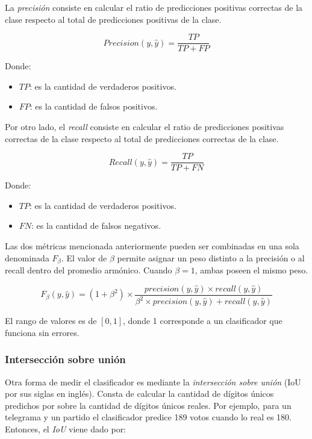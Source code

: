 La {\it precisión} consiste en calcular el ratio de predicciones positivas correctas de la clase respecto al total de
predicciones positivas de la clase.

\begin{equation}
    Precision(y, \hat{y}) = \frac{TP}{TP + FP}
\end{equation}

Donde:
\begin{itemize}
    \item $TP$: es la cantidad de verdaderos positivos.
    \item $FP$: es la cantidad de falsos positivos.
\end{itemize}

Por otro lado, el {\it recall} consiste en calcular el ratio de predicciones positivas correctas de la clase respecto
al total de predicciones correctas de la clase.

\begin{equation}
    Recall(y, \hat{y}) = \frac{TP}{TP + FN}
\end{equation}

Donde:
\begin{itemize}
    \item $TP$: es la cantidad de verdaderos positivos.
    \item $FN$: es la cantidad de falsos negativos.
\end{itemize}

Las dos métricas mencionada anteriormente pueden ser combinadas en una sola denominada $F_{\beta}$. El valor de $\beta$
permite asignar un peso distinto a la precisión o al recall dentro del promedio armónico. Cuando $\beta=1$, ambas
poseen el mismo peso.

\begin{equation}
    F_{\beta}(y, \hat{y}) = (1 + \beta^2) \times \frac{precision(y, \hat{y}) \times recall(y, \hat{y})}{\beta^2 \times precision(y, \hat{y}) + recall(y, \hat{y})}
\end{equation}

El rango de valores es de $[0, 1]$, donde 1 corresponde a un clasificador que funciona sin errores.

\subsubsection{Intersección sobre unión}

Otra forma de medir el clasificador es mediante la {\it intersección sobre unión} (IoU por sus siglas en inglés).
Consta de calcular la cantidad de dígitos únicos predichos por sobre la cantidad de dígitos únicos reales. Por ejemplo,
para un telegrama y un partido el clasificador predice 189 votos cuando lo real es 180. Entonces, el {\it IoU} viene
dado por:

